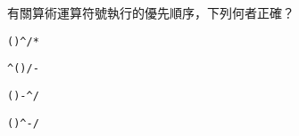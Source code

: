\ifx\ntpcNinetyTwo\undefined[92學年基北區] \fi
有關算術運算符號執行的優先順序，下列何者正確？
  \begin{optionlist}
  \item \texttt{()\^{}/*}\label{ntpc-92-a15}
  \item \texttt{\^{}()/-}
  \item \texttt{()-\^{}/}
  \item \texttt{()\^{}-/}
  \end{optionlist}